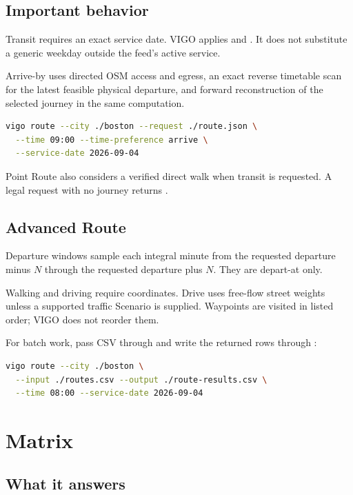 \documentclass[10pt,letterpaper]{article}
\begin{document}
\subsection{Important behavior}

Transit requires an exact service date. VIGO applies  and . It does not substitute a generic weekday outside the feed's active service.

Arrive-by uses directed OSM access and egress, an exact reverse timetable scan for the latest feasible physical departure, and forward reconstruction of the selected journey in the same computation.

\begin{lstlisting}[language=bash]
vigo route --city ./boston --request ./route.json \
  --time 09:00 --time-preference arrive \
  --service-date 2026-09-04
\end{lstlisting}

Point Route also considers a verified direct walk when transit is requested. A legal request with no journey returns .

\subsection{Advanced Route}

Departure windows sample each integral minute from the requested departure minus $N$ through the requested departure plus $N$. They are depart-at only.

Walking and driving require coordinates. Drive uses free-flow street weights unless a supported traffic Scenario is supplied. Waypoints are visited in listed order; VIGO does not reorder them.

For batch work, pass CSV through \field{--input} and write the returned rows through \field{--output}:

\begin{lstlisting}[language=bash]
vigo route --city ./boston \
  --input ./routes.csv --output ./route-results.csv \
  --time 08:00 --service-date 2026-09-04
\end{lstlisting}

\section{Matrix}

\subsection{What it answers}
\end{document}
